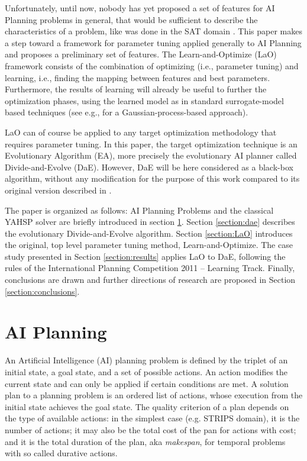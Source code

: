 \documentclass{MYsig-alternate}
\begin{document}
Unfortunately, until now, nobody has yet proposed a set of features for AI Planning problems in general, that would be sufficient to describe the characteristics of a problem, like was done in the SAT domain \cite{Hutter06}. This paper makes a step toward a framework for parameter tuning applied generally to AI Planning and proposes a preliminary set of features. The Learn-and-Optimize (LaO) framework consists of the combination of optimizing (i.e., parameter tuning) and learning, i.e., finding the mapping between features and best parameters. Furthermore, the results of learning will already be useful to further the optimization phases, using the learned model as in standard surrogate-model based techniques (see e.g., \cite{Bardenet} for a Gaussian-process-based approach).

LaO can of course be applied to any target optimization methodology that requires parameter tuning. In this paper, the target optimization technique is an Evolutionary Algorithm (EA), more precisely the evolutionary AI planner called Divide-and-Evolve (DaE). However, DaE will be here considered as a black-box algorithm, without any modification for the purpose of this work compared to its original version described in \cite{BibEvoCop:2010}. 

The paper is organized as follows: AI Planning Problems and the classical YAHSP solver are briefly introduced in section \ref{section:planning}. Section \ref{section:dae} describes the evolutionary  Divide-and-Evolve algorithm. Section \ref{section:LaO} introduces the original, top level parameter tuning method, Learn-and-Optimize. The case study presented in Section \ref{section:results} applies LaO to DaE, following the rules of the International Planning Competition 2011 -- Learning Track. Finally, conclusions are drawn and further directions of research are proposed in Section \ref{section:conclusions}. 

\section{AI Planning}
\label{section:planning}

An Artificial Intelligence (AI) planning problem is defined by the triplet of an initial state, a goal state, and a set of possible actions. An action modifies the current state and can only be applied if certain conditions are met. A solution plan to a planning problem is an ordered list of actions, whose execution from the initial state achieves the goal state. The quality criterion of a plan depends on the type of available actions: in the simplest case (e.g. STRIPS domain), it is the number of actions; it may also be the total cost of the pan for actions with cost; and it is the total duration of the plan, aka {\em makespan}, for temporal problems with so called durative actions.
\end{document}
